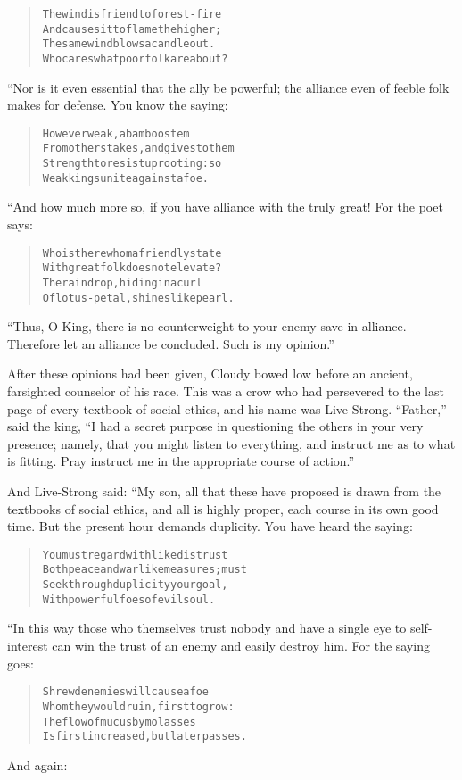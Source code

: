 \documentclass[article, twoside, 14pt]{memoir}
\renewenvironment{verbatim}{%
\begin{quote}%
\vskip -10pt%
\begin{alltt}\normalfont\large}{\end{alltt}%
\end{quote}%
\vskip -10pt
} %
\begin{document}
\begin{verbatim}
The wind is friend to forest-fire
And causes it to flame the higher;
The same wind blows a candle out.
Who cares what poor folk are about?
\end{verbatim}
“Nor is it even essential that the ally be powerful; the alliance
even of feeble folk makes for defense. You know the saying:

\begin{verbatim}
However weak, a bamboo stem
From others takes, and gives to them
Strength to resist uprooting: so
Weak kings unite against a foe.
\end{verbatim}
“And how much more so, if you have alliance with the truly great!
For the poet says:

\begin{verbatim}
Who is there whom a friendly state
With great folk does not elevate?
The raindrop, hiding in a curl
Of lotus-petal, shines like pearl.
\end{verbatim}
``Thus, O King, there is no counterweight to your enemy save in alliance. Therefore let an alliance be concluded. Such is my opinion.''

After these opinions had been given, Cloudy bowed low before an
ancient, farsighted counselor of his race. This was a crow
who had persevered to the last page of every textbook of social
ethics, and his name was Live-Strong. ``Father,'' said the king,
``I had a secret purpose in questioning the others in your very presence; namely, that you might listen to everything, and instruct me as to what is fitting. Pray instruct me in the appropriate course of action.''

And Live-Strong said: “My son, all that these have proposed is
drawn from the textbooks of social ethics, and all is highly
proper, each course in its own good time. But the present hour
demands duplicity. You have heard the saying:

\begin{verbatim}
You must regard with like distrust
Both peace and warlike measures; must
Seek through duplicity your goal,
With powerful foes of evil soul.
\end{verbatim}
“In this way those who themselves trust nobody and have a single
eye to self-interest can win the trust of an enemy and easily
destroy him. For the saying goes:

\begin{verbatim}
Shrewd enemies will cause a foe
Whom they would ruin, first to grow:
The flow of mucus by molasses
Is first increased, but later passes.
\end{verbatim}
And again:
\end{document}
